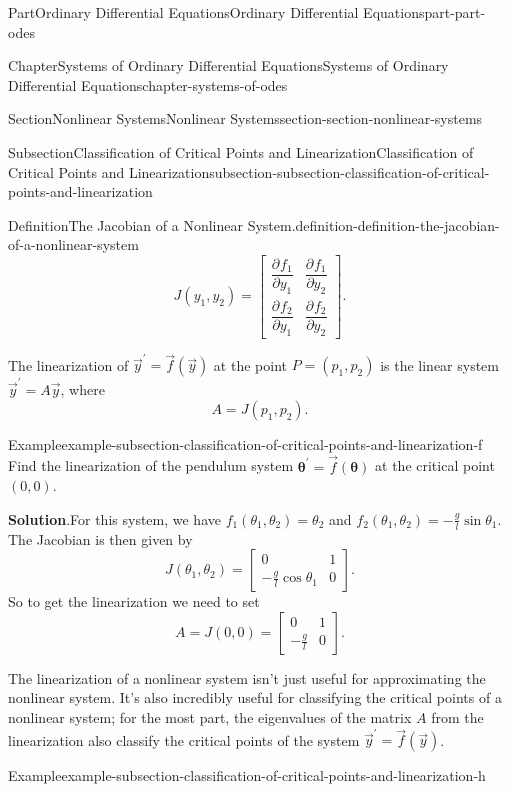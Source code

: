 \documentclass[twoside,10pt,]{book}
\newcommand{\blocktitlefont}{\relax}
\numberwithin{equation}{part}
\newcommand{\vecm}[1]{\boldsymbol{#1}}
\newcommand{\pdv}[3][]{\dfrac{\partial^{#1} #2}{\partial #3^{#1}}}
\begin{document}
\begin{partptx}{Part}{Ordinary Differential Equations}{}{Ordinary Differential Equations}{}{}{part-part-odes}
\begin{chapterptx}{Chapter}{Systems of Ordinary Differential Equations}{}{Systems of Ordinary Differential Equations}{}{}{chapter-systems-of-odes}
\begin{sectionptx}{Section}{Nonlinear Systems}{}{Nonlinear Systems}{}{}{section-section-nonlinear-systems}
\begin{subsectionptx}{Subsection}{Classification of Critical Points and Linearization}{}{Classification of Critical Points and Linearization}{}{}{subsection-subsection-classification-of-critical-points-and-linearization}
\begin{definition}{Definition}{The Jacobian of a Nonlinear System.}{definition-definition-the-jacobian-of-a-nonlinear-system}
\begin{equation*}
J(y_{1},y_{2}) = \begin{bmatrix}\pdv{f_{1}}{y_{1}} &  \pdv{f_{1}}{y_{2}} \\ \pdv{f_{2}}{y_{1}} &  \pdv{f_{2}}{y_{2}}\end{bmatrix}.
\end{equation*}
%
\end{definition}
The linearization of \(\vec{y}^\prime = \vec{f}(\vec{y})\) at the point \(P = (p_{1},p_{2})\) is the linear system \(\vec{y}^\prime = A\vec{y}\), where%
\begin{equation*}
A = J(p_{1},p_{2}).
\end{equation*}
%
\begin{example}{Example}{}{example-subsection-classification-of-critical-points-and-linearization-f}%
Find the linearization of the pendulum system \(\vecm{\theta}^\prime = \vec{f}(\vecm{\theta})\) at the critical point \((0,0)\).%
\par\smallskip%
\noindent\textbf{\blocktitlefont Solution}.\hypertarget{solution-subsection-classification-of-critical-points-and-linearization-f-b}{}\quad{}For this system, we have \(f_{1}(\theta_{1},\theta_{2}) = \theta_{2}\) and \(f_{2}(\theta_{1},\theta_{2}) = -\frac{g}{l}\sin\theta_{1}\). The Jacobian is then given by%
\begin{equation*}
J(\theta_{1},\theta_{2}) = \begin{bmatrix}0 &  1 \\ -\frac{g}{l}\cos\theta_{1} &  0\end{bmatrix}.
\end{equation*}
So to get the linearization we need to set%
\begin{equation*}
A = J(0,0) = \begin{bmatrix}0 &  1 \\ -\frac{g}{l} &  0\end{bmatrix}.
\end{equation*}
%
\end{example}
The linearization of a nonlinear system isn't just useful for approximating the nonlinear system. It's also incredibly useful for classifying the critical points of a nonlinear system; for the most part, the eigenvalues of the matrix \(A\) from the linearization also classify the critical points of the system \(\vec{y}^\prime = \vec{f}(\vec{y})\).%
\begin{example}{Example}{}{example-subsection-classification-of-critical-points-and-linearization-h}%

\end{example}
\end{subsectionptx}
\end{sectionptx}
\end{chapterptx}
\end{partptx}
\end{document}
